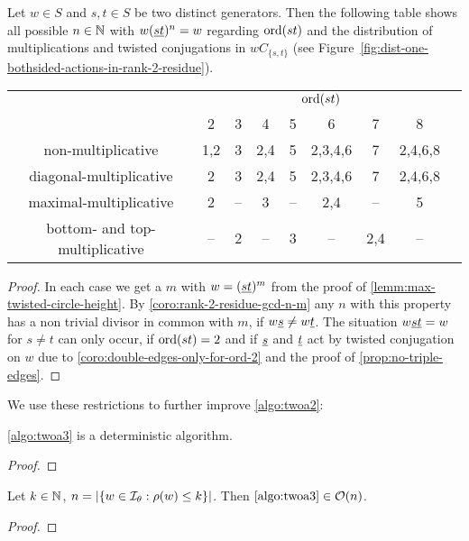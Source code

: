 \begin{coro}
	Let $w \in S$ and $s,t \in S$ be two distinct generators. Then the following table shows all possible $n \in \mathbb{N}$ with $w(\underline{s} \underline{t})^n = w$ regarding $\operatorname{ord}(st)$ and the distribution of multiplications and twisted conjugations in $wC_{\{s,t\}}$ (see Figure~\ref{fig:dist-one-bothsided-actions-in-rank-2-residue}).

	\begin{center}
		\begin{tabular}{c|ccccccc|c}
													& \multicolumn{7}{c|}{$\operatorname{ord}(st)$} \\
													& 2 & 3 & 4 & 5 & 6 & 7 & 8 \\
			\hline
			\textrm{non-multiplicative}				& 1,2 & 3 & 2,4 & 5 & 2,3,4,6 & 7 & 2,4,6,8 \\
			\textrm{diagonal-multiplicative}		& 2 & 3 & 2,4 & 5 & 2,3,4,6 & 7 & 2,4,6,8 \\
			\textrm{maximal-multiplicative}			& 2 & -- & 3 & -- & 2,4 & -- & 5 \\
			\textrm{bottom- and top-multiplicative}	& -- & 2 & -- & 3 & -- & 2,4 & -- \\
		\end{tabular}		
	\end{center}

	\begin{proof}
		In each case we get a $m$ with $w = (\underline{s} \underline{t})^m$ from the proof of \ref{lemm:max-twisted-circle-height}. By \ref{coro:rank-2-residue-gcd-n-m} any $n$ with this property has a non trivial divisor in common with $m$, if $w \underline{s} \neq w \underline{t}$. The situation $w \underline{s} \underline{t} = w$ for $s \neq t$ can only occur, if $\operatorname{ord}(st) = 2$ and if $\underline{s}$ and $\underline{t}$ act by twisted conjugation on $w$ due to \ref{coro:double-edges-only-for-ord-2} and the proof of \ref{prop:no-triple-edges}.
	\end{proof}
\end{coro}

We use these restrictions to further improve \ref{algo:twoa2}:

\begin{algo}[TWOA3]
	\todo
\end{algo}

\begin{lemm}
	\ref{algo:twoa3} is a deterministic algorithm.

	\begin{proof}
		\todo
	\end{proof}
\end{lemm}

\begin{lemm}
	Let $k \in \mathbb{N}$, $n = |\{ w \in \mathcal{I}_{\theta} : \rho(w) \leq k \}|$. Then $\ref{algo:twoa3} \in \mathcal{O}(n)$.

	\begin{proof}
		\todo
	\end{proof}
\end{lemm}